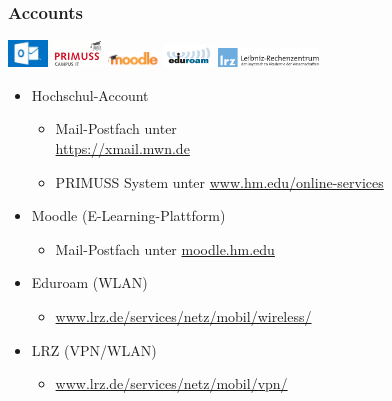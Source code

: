 \documentclass{beamer}
\begin{document}
    \begin{frame}[t]
    	\frametitle{Accounts}
    	\qquad
    	\includegraphics[width=0.08\textwidth]{xmail.jpg}
    	\qquad
    	\includegraphics[width=0.1\textwidth]{primuss.jpg}
    	\qquad
    	\includegraphics[width=0.1\textwidth]{moodle.png}
    	\qquad
    	\includegraphics[width=0.1\textwidth]{eduroam.png}
    	\qquad
    	\includegraphics[width=0.2\textwidth]{lrz.png}
    	\begin{itemize} 
    		\item Hochschul-Account
    		\begin{itemize}
    			\item Mail-Postfach unter \\ \url{https://xmail.mwn.de}
    			\item PRIMUSS System unter \url{www.hm.edu/online-services}
    		\end{itemize}
    		\pause
    		\item Moodle (E-Learning-Plattform)
    		\begin{itemize}
    			\item Mail-Postfach unter \url{moodle.hm.edu}
    		\end{itemize}
    		\pause
    		\item Eduroam (WLAN)
    		\begin{itemize}
    			\item \url{www.lrz.de/services/netz/mobil/wireless/}
    		\end{itemize}
    		\pause
    		\item LRZ (VPN/WLAN)
    		\begin{itemize}
    			\item \url{www.lrz.de/services/netz/mobil/vpn/}
    		\end{itemize}
    	\end{itemize}
    \end{frame}
    
\end{document}

